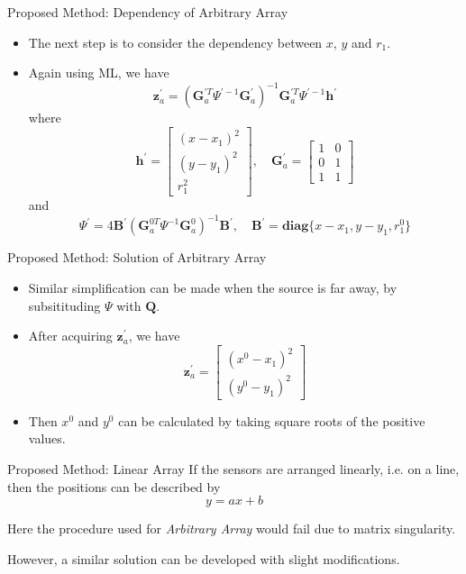 \documentclass[10pt]{beamer}
\begin{document}
\begin{frame}{Proposed Method: Dependency of Arbitrary Array}
  \begin{itemize}
    \item The next step is to consider the dependency between $x$, $y$ and $r_1$.
    \item Again using ML, we have
          $$\mathbf{z}_a^{'}=(\mathbf{G}_a^{'T}\Psi^{'-1}\mathbf{G}_a^{'})^{-1}
                              \mathbf{G}_a^{'T}\Psi^{'-1}\mathbf{h}^{'}$$
          where
          $$\mathbf{h}^{'}=\begin{bmatrix}(x-x_1)^2\\(y-y_1)^2\\r_1^2\end{bmatrix},\quad
            \mathbf{G}_a^{'}=\begin{bmatrix}1&0\\0&1\\1&1\end{bmatrix}$$
          and
          $$\Psi^{'}=4\mathbf{B}^{'}(\mathbf{G}_a^{0T}\Psi^{-1}\mathbf{G}_a^0)^{-1}\mathbf{B}^{'},\quad
            \mathbf{B}^{'} = \textbf{diag} \{x-x_1,y-y_1,r_1^0\}$$
  \end{itemize}
\end{frame}

\begin{frame}{Proposed Method: Solution of Arbitrary Array}
  \begin{itemize}
    \item Similar simplification can be made when the source is far away,
          by subsitituding $\Psi$ with $\mathbf{Q}$.
    \item After acquiring $\mathbf{z}_a^{'}$, we have
          $$\mathbf{z}_a^{'}=
            \begin{bmatrix}(x^0-x_1)^2\\(y^0-y_1)^2\end{bmatrix}$$
    \item Then $x^0$ and $y^0$ can be calculated by taking square roots of the positive values.
  \end{itemize}
\end{frame}

\begin{frame}{Proposed Method: Linear Array}
  If the sensors are arranged linearly, i.e. on a line, then the positions
  can be described by $$y=ax+b$$

  Here the procedure used for \emph{Arbitrary Array} would fail due to matrix singularity.

  However, a similar solution can be developed with slight modifications.
\end{frame}
\end{document}

